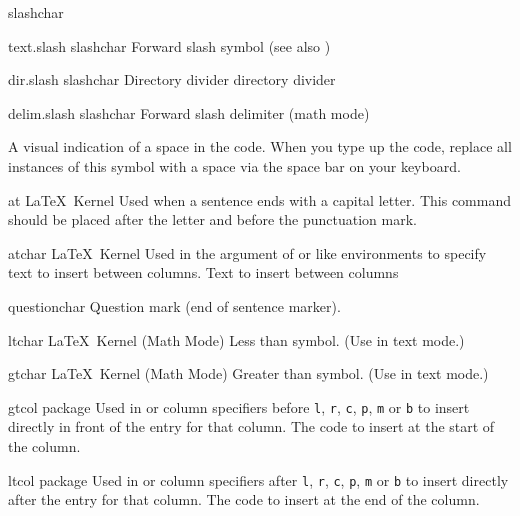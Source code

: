  {slashchar}
 {\slashsym}
 {}
 {}
 {\nopostdesc}
 {}

 {text.slash}
 {slashchar}
 {\slashsym}
 {Forward slash symbol (see also )}

 {dir.slash}
 {slashchar}
 {\slashsym}
 {Directory divider}
 {directory divider}

 {delim.slash}
 {slashchar}
 {\slashsym}
 {Forward slash delimiter (math mode)}

 {\textvisiblespace}
 {}
 {}
 {A visual indication of a space in the code. When you type up 
   the code, replace all instances of this symbol with a space via the space bar on your 
   keyboard.}
 {}

 {at}
 {\atsym}
 {}
 {\LaTeX\ Kernel}
 {Used when a sentence ends with a capital letter.
   This command should be placed after the letter and before the
   punctuation mark.}
 {}

 {atchar}
 {\atsym}
 {}
 {\LaTeX\ Kernel}
 {%
   Used in the argument of  or 
    like environments to specify text to insert between columns.%
 }
 {%
     \BeginArgList
       Text to insert between columns
     \EndArgList
 }
  
 {questionchar}
 {\questionsym}
 {}
 {}
 {Question mark (end of sentence marker).}
 {}

 {ltchar}
 {\lesssym}
 {}
 {\LaTeX\ Kernel (Math Mode)}
 {Less than symbol. (Use  in text mode.)}
 {}

 {gtchar}
 {\greatersym}
 {}
 {\LaTeX\ Kernel (Math Mode)}
 {Greater than symbol. (Use  in text mode.)}
 {}

 {gtcol}
 {\greatersym}
 {}
 { package}
 {%
   Used in  or  column specifiers before
   \texttt{l}, \texttt{r}, \texttt{c}, \texttt{p}, \texttt{m} or
   \texttt{b} to insert  directly in front of the entry
   for that column.%
 }
 {%
     \BeginArgList
        The code to insert at the start of the
         column.
     \EndArgList
 }

 {ltcol}
 {\lesssym}
 {}
 { package}
 {%
   Used in  or  column specifiers after
   \texttt{l}, \texttt{r}, \texttt{c}, \texttt{p}, \texttt{m} or
   \texttt{b} to insert  directly after the entry
   for that column.%
 }
 {%
     \BeginArgList
        The code to insert at the end of the
         column.
     \EndArgList
 }

